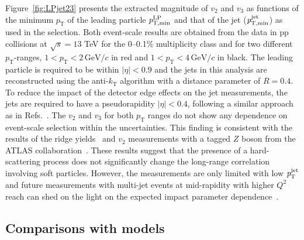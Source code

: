 Figure~\ref{fig:LPjet23} presents the extracted magnitude of $v_2$ and $v_3$ as functions of the minimum $p_\mathrm{T}$ of the leading particle $\it{p}^{\rm{LP}}_{\rm{T,min}}$ and that of the jet ($\it{p}^{\rm{jet}}_{\rm{T,min}}$) as used in the selection. 
Both event-scale results are obtained from the data in pp collisions at $\sqrt{s}= 13$ TeV for the 0--0.1\% multiplicity class and for two different $p_\mathrm{T}$-ranges, $1<p_{\mathrm{T}}<2\,\mathrm{GeV}/c$ in red and $1<p_{\mathrm{T}}<4\,\mathrm{GeV}/c$ in black. The leading particle is required to be within $|\eta|<0.9$ and the jets in this analysis are reconstructed using the anti-$k_\mathrm{T}$ algorithm with a distance parameter of $R=0.4$. To reduce the impact of the detector edge effects on the jet measurements, the jets are required to have a pseudorapidity $|\eta|<0.4$, following a similar approach as in Refs.~\cite{PhysRevD.65.092002, Aad:2011fc, Khachatryan:2014waa}. The $v_2$ and $v_3$ for both $p_\mathrm{T}$ ranges do not show any dependence on event-scale selection within the uncertainties. This finding is consistent with the results of the ridge yields~\cite{ALICE:2021nir} and $v_{2}$ measurements with a tagged $Z$ boson from the ATLAS collaboration~\cite{Aaboud:2019mcw}. These results suggest that the presence of a hard-scattering process does not significantly change the long-range correlation involving soft particles.
However, the measurements are only limited with low $\it{p}^{\rm{jet}}_{\rm{T}}$ and future measurements with multi-jet events at mid-rapidity with higher $Q^2$ reach can shed on the light on the expected impact parameter dependence~\cite{Sjostrand:1986ep,Frankfurt:2003td,Frankfurt:2010ea}.


\subsection{Comparisons with models}
\label{sec:theory}

